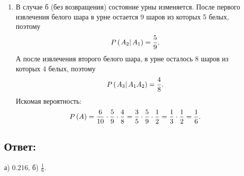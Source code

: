 \begin{enumerate}
    \item В случае б (без возвращения) состояние урны изменяется. После первого извлечения белого шара в урне остается 9 шаров из которых 5 белых,
    поэтому
    \begin{equation}
        P \left ( \left . A_2 \right | A_1 \right ) = \frac{5}{9} .
    \end{equation}
    А после извлечения второго белого шара, в урне осталось 8 шаров из которых 4 белых, поэтому
    \begin{equation}
        P \left ( \left . A_3 \right | A_1 A_2 \right ) = \frac{4}{8} .
    \end{equation}
    Искомая вероятность:
    \begin{equation}
        P \left ( A \right )
        = \frac{6}{10} \cdot \frac{5}{9} \cdot \frac{4}{8}
        = \frac{3}{5} \cdot \frac{5}{9} \cdot \frac{1}{2}
        = \frac{1}{3} \cdot \frac{1}{2}
        = \frac{1}{6} .
    \end{equation}
\end{enumerate}

\subsection*{Ответ:}
а) $0.216$, б) $\frac{1}{6}$.

